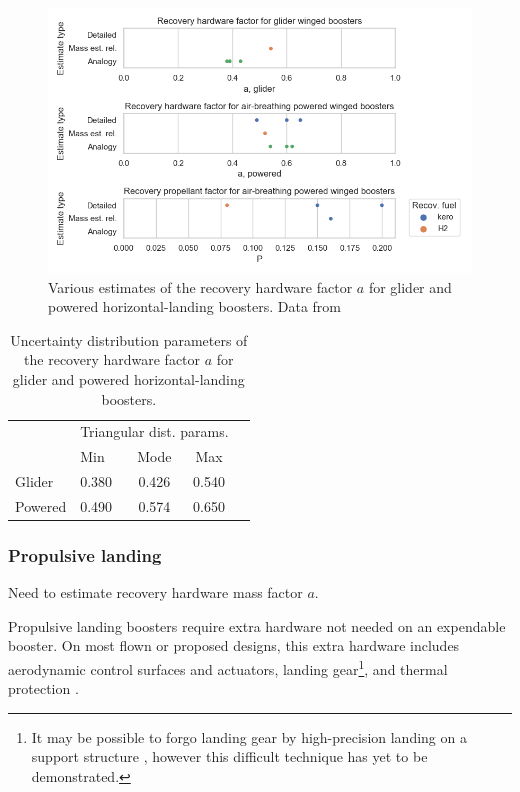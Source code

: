 \documentclass[conf]{../new-aiaa}
\begin{document}
\begin{figure}[hbt!]
    \centering
    \includegraphics[width=1\textwidth]{recov_strats/winged_perf_factors}
    \caption{\label{fig:winged_perf_factors} Various estimates of the recovery hardware factor $a$ for glider and powered horizontal-landing boosters. Data from \cite{Hellman2005, Isakowitz2004, Healy1998, Sippel2003}}
\end{figure}

\begin{table}[hbt!]
    \centering
    \caption{\label{tab:winged_pref_factor_distributions} Uncertainty distribution parameters of the recovery hardware factor $a$ for glider and powered horizontal-landing boosters.}
    \begin{tabular}{l l c c c}
    \hline
     & \multicolumn{3}{c}{Triangular dist. params.} \\
    & Min & Mode & Max \\
    \hline
    \hline
    Glider  & 0.380 & 0.426 & 0.540 \\
    Powered & 0.490 & 0.574 & 0.650 \\
    \hline
    \end{tabular}
\end{table}

\subsubsection{Propulsive landing}

Need to estimate recovery hardware mass factor $a$.

Propulsive landing boosters require extra hardware not needed on an expendable booster. On most flown or proposed designs, this extra hardware includes aerodynamic control surfaces and actuators, landing gear\footnote{It may be possible to forgo landing gear by high-precision landing on a support structure \cite{Musk2017}, however this difficult technique has yet to be demonstrated.}, and thermal protection \cite{NewGlenn, Falcon9, DCX, Musk2017}.
\end{document}
